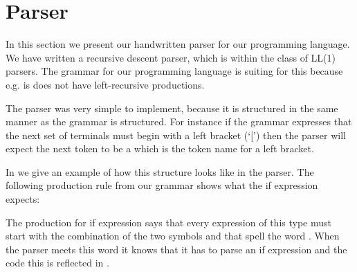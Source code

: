 \section{Parser}

In this section we present our handwritten parser for our programming language. We have written a recursive descent parser, which is within the class of LL(1) parsers. The grammar for our programming language is suiting for this because e.g. is does not have left-recursive productions. 

The parser was very simple to implement, because it is structured in the same manner as the grammar is structured. For instance if the grammar expresses that the next set of terminals must begin with a left bracket (`[') then the parser will expect the next token to be a  which is the token name for a left bracket. 

In  we give an example of how this structure looks like in the parser. The following production rule from our grammar shows what the if expression expects:

\begin{ebnf}
\end{ebnf}

The production for if expression says that every expression of this type must start with the combination of the two symbols  and  that spell the word . When the parser meets this word it knows that it has to parse an if expression and the code this is reflected in .











